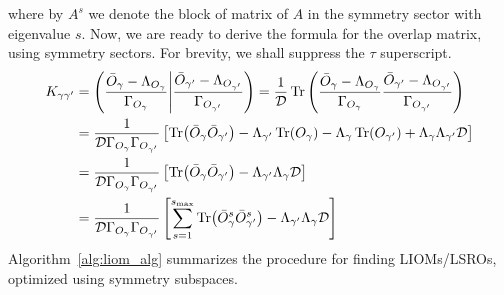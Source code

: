 where by \(A^s\) we denote the block of matrix of \(A\) in the symmetry sector with eigenvalue \(s\).
Now, we are ready to derive the formula for the overlap matrix, using symmetry sectors. For brevity,
we shall suppress the \(\tau\) superscript.
\begin{align}
  K_{\gamma\gamma^{\prime}} & = \left(\frac{\bar{O}_{\gamma} - \Lambda_{O_{\gamma}}}{\Gamma_{O_{\gamma}}} \middle| \frac{\bar{O}_{\gamma^{\prime}} - \Lambda_{O_{\gamma^{\prime}}}}{\Gamma_{O_{\gamma^{\prime}}}}\right)
  = \frac{1}{\mathcal{D}} \Tr\left(\frac{\bar{O}_{\gamma} - \Lambda_{O_{\gamma}}}{\Gamma_{O_{\gamma}}}\frac{\bar{O}_{\gamma^{\prime}} - \Lambda_{O_{\gamma^{\prime}}}}{\Gamma_{O_{\gamma^{\prime}}}}\right) \nonumber                                                                                                         \\
                            & = \frac{1}{\mathcal{D} \Gamma_{O_{\gamma}}\Gamma_{O_{\gamma^{\prime}}}} \left[\Tr(\bar{O}_{\gamma} \bar{O}_{\gamma^{\prime}}) - \Lambda_{\gamma^{\prime}} \Tr(O_{\gamma}) - \Lambda_{\gamma} \Tr(O_{\gamma^{\prime}}) + \Lambda_{\gamma} \Lambda_{\gamma^{\prime}} \mathcal{D} \right]\nonumber \\
                            & = \frac{1}{\mathcal{D} \Gamma_{O_{\gamma}}\Gamma_{O_{\gamma^{\prime}}}} \left[\Tr(\bar{O}_{\gamma} \bar{O}_{\gamma^{\prime}}) - \Lambda_{\gamma^{\prime}} \Lambda_{\gamma} \mathcal{D} \right] \nonumber                                                                                        \\
                            & = \frac{1}{\mathcal{D} \Gamma_{O_{\gamma}}\Gamma_{O_{\gamma^{\prime}}}} \left[\sum_{s=1}^{s_{\text{max}}} \Tr(\bar{O}_{\gamma}^s \bar{O}_{\gamma^{\prime}}^s) - \Lambda_{\gamma^{\prime}} \Lambda_{\gamma} \mathcal{D} \right]
\end{align}
Algorithm~\ref{alg:liom_alg} summarizes the procedure for finding LIOMs/LSROs, optimized using symmetry subspaces.
